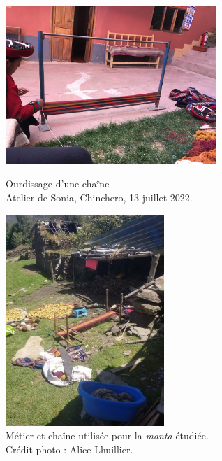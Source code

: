 \documentclass[a4paper, twoside, 12pt]{book}
\begin{document}
\begin{figure}[!h]
    \begin{minipage}[c]{.5\linewidth}
            \begin{center}
                \includegraphics[width=8cm]{images/ourdissage.jpg}
            \caption[Ourdissage d'une chaîne]{Ourdissage d'une chaîne \\ Atelier de Sonia, Chinchero, 13 juillet 2022.}
            \label{ourdissage}
            \end{center}
    \end{minipage}
        \begin{minipage}[c]{.5\linewidth}
            \begin{center}
            \includegraphics[width=6cm]{images/metierAngelica.jpeg}
            \caption[Métier et chaîne utilisée pour la \textit{manta} étudiée]{Métier et chaîne utilisée pour la \textit{manta} étudiée.\\ Crédit photo : Alice Lhuillier.}
            \label{métierAngelica} 
            \end{center}
    \end{minipage}
\end{figure}
\end{document}

